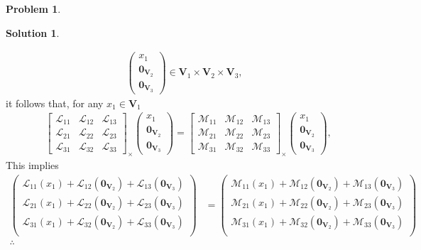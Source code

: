 \documentclass{article}
\theoremstyle{definition}
\newtheorem*{prob*}{Problem}
\newtheorem*{sln*}{Solution}
\newcommand{\V}{\mathbf{V}}
\newcommand{\lag}{\mathcal{L}}
\newcommand{\M}{\mathcal{M}}
\begin{document}
\begin{prob*}
\begin{sln*}
\begin{enumerate}
\begin{align*}
\begin{pmatrix}
			x_1\\\mathbf{0}_{\V_2}\\\mathbf{0}_{\V_3}
			\end{pmatrix} \in \V_1 \times \V_2 \times \V_3,
			\end{align*}
			it follows that, for any $x_1 \in \V_1$
			\begin{align*}
			&\begin{bmatrix}
			\lag_{11} & \lag_{12} & \lag_{13}\\
			\lag_{21} & \lag_{22} & \lag_{23}\\
			\lag_{31} & \lag_{32} & \lag_{33} 
			\end{bmatrix}_\times \begin{pmatrix}
			x_1\\\mathbf{0}_{\V_2}\\\mathbf{0}_{\V_3}
			\end{pmatrix}
			=
			\begin{bmatrix}
			\M_{11} & \M_{12} & \M_{13}\\
			\M_{21} & \M_{22} & \M_{23}\\
			\M_{31} & \M_{32} & \M_{33}
			\end{bmatrix}_\times \begin{pmatrix}
			x_1\\\mathbf{0}_{\V_2}\\\mathbf{0}_{\V_3}
			\end{pmatrix},
			\end{align*}
			This implies
			\begin{align*}
			\begin{pmatrix}
			\lag_{11}(x_1) + \lag_{12}(\mathbf{0}_{\V_2}) + \lag_{13}(\mathbf{0}_{\V_3})\\
			\lag_{21}(x_1) + \lag_{22}(\mathbf{0}_{\V_2}) + \lag_{23}(\mathbf{0}_{\V_3})\\
			\lag_{31}(x_1) + \lag_{32}(\mathbf{0}_{\V_2}) + \lag_{33}(\mathbf{0}_{\V_3})\\
			\end{pmatrix}
			&=
			\begin{pmatrix}
			\M_{11}(x_1) + \M_{12}(\mathbf{0}_{\V_2}) + \M_{13}(\mathbf{0}_{\V_3})\\
			\M_{21}(x_1) + \M_{22}(\mathbf{0}_{\V_2}) + \M_{23}(\mathbf{0}_{\V_3})\\
			\M_{31}(x_1) + \M_{32}(\mathbf{0}_{\V_2}) + \M_{33}(\mathbf{0}_{\V_3})\\
			\end{pmatrix}\\
			\therefore 

\end{align*}
\end{enumerate}
\end{sln*}
\end{prob*}
\end{document}
